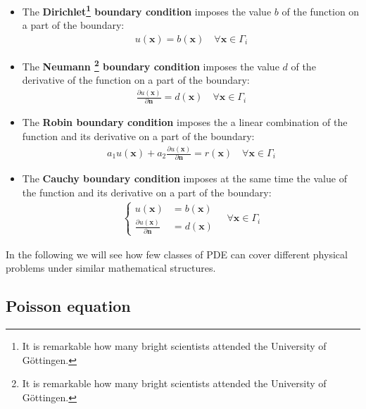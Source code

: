 \documentclass{digitaldynamics}
\def\vect#1{\bm{#1}}
\begin{document}
\begin{itemize}
	\item The \textbf{Dirichlet\footnote{It is remarkable how many bright scientists attended the University of Göttingen.} boundary condition} imposes the value $b$ of the function on a part of the boundary:
	\begin{align}
	u(\vect{x}) = b(\vect{x})  \quad \forall \vect{x} \in \Gamma_i
	\label{dirichlet}
	\end{align}
	
	\item The \textbf{Neumann \footnote{It is remarkable how many bright scientists attended the University of Göttingen.} boundary condition} imposes the value $d$ of the derivative of the function on a part of the boundary:
	\begin{align}
	\frac{\partial{u(\vect{x})}}{\partial \vect{n}} = d(\vect{x}) \quad \forall \vect{x} \in \Gamma_i
	\label{dirichlet}
	\end{align}
	
	\item The \textbf{Robin boundary condition} imposes the a linear combination of the function and its derivative on a part of the boundary:
	\begin{align}
	a_1 u(\vect{x})  + a_2 \frac{\partial{u(\vect{x})}}{\partial \vect{n}} = r(\vect{x}) \quad \forall \vect{x} \in \Gamma_i
	\label{robin}
	\end{align}
	
	\item The \textbf{Cauchy boundary condition} imposes at the same time the value of the function and its derivative on a part of the boundary:
	\begin{align}
	\left\{
	\begin{aligned}
		u(\vect{x}) &= b(\vect{x}) \\
		\frac{\partial{u(\vect{x})}}{\partial \vect{n}} &= d(\vect{x})
	\end{aligned}
	\right.
	\quad \forall \vect{x} \in \Gamma_i
	\label{cauchy}
	\end{align}
	
\end{itemize}

In the following we will see how few classes of PDE can cover different physical problems under similar mathematical structures.




\subsection{Poisson equation}
\end{document}
